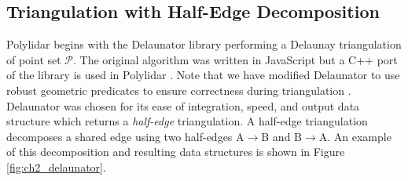 \subsection{Triangulation with Half-Edge Decomposition} \label{sec:ch2_tri}

Polylidar begins with the Delaunator library \cite{noauthor_github_2018} performing a Delaunay triangulation of point set $\mathcal{P}$. The original algorithm was written in JavaScript but a C++ port of the library is used in Polylidar \cite{noauthor_github_2018-1}. Note that we have modified Delaunator to use robust geometric predicates to ensure correctness during triangulation \cite{richard_shewchuk_adaptive_1997}. Delaunator was chosen for its ease of integration, speed, and output data structure which returns a \emph{half-edge} triangulation. A half-edge triangulation decomposes a shared edge using two half-edges A$\rightarrow$B and B$\rightarrow$A. An example of this decomposition and resulting data structures is shown in Figure \ref{fig:ch2_delaunator}. 




